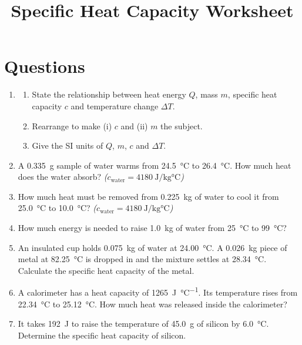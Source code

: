 \documentclass{article}
\title{Specific Heat Capacity Worksheet}
\author{}
\date{}
\begin{document}
\maketitle

\section*{Questions}

\begin{enumerate}
\item 
\begin{enumerate}
    \item State the relationship between heat energy $Q$, mass $m$, specific heat capacity $c$ and temperature change $\Delta T$.
    \item Rearrange to make (i) $c$ and (ii) $m$ the subject.
    \item Give the SI units of $Q$, $m$, $c$ and $\Delta T$.
\end{enumerate}

\item A \SI{0.335}{\gram} sample of water warms from \SI{24.5}{\degreeCelsius} to \SI{26.4}{\degreeCelsius}. How much heat does the water absorb? \textit{($c_\text{water}= \SI{4180}{\joule\per\kilogram\celsius}$)}

\item How much heat must be removed from \SI{0.225}{\kilogram} of water to cool it from \SI{25.0}{\degreeCelsius} to \SI{10.0}{\degreeCelsius}? \textit{($c_\text{water}= \SI{4180}{\joule\per\kilogram\celsius}$)}

\item How much energy is needed to raise \SI{1.0}{\kilogram} of water from \SI{25}{\degreeCelsius} to \SI{99}{\degreeCelsius}?

\item An insulated cup holds \SI{0.075}{\kilogram} of water at \SI{24.00}{\degreeCelsius}. A \SI{0.026}{\kilogram} piece of metal at \SI{82.25}{\degreeCelsius} is dropped in and the mixture settles at \SI{28.34}{\degreeCelsius}. Calculate the specific heat capacity of the metal.

\item A calorimeter has a heat capacity of \SI{1265}{\joule\per\degreeCelsius}. Its temperature rises from \SI{22.34}{\degreeCelsius} to \SI{25.12}{\degreeCelsius}. How much heat was released inside the calorimeter?

\item It takes \SI{192}{\joule} to raise the temperature of \SI{45.0}{\gram} of silicon by \SI{6.0}{\degreeCelsius}. Determine the specific heat capacity of silicon.


\end{enumerate}
\end{document}
